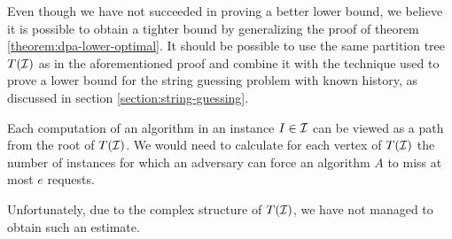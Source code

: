 Even though we have not succeeded in proving a better lower bound, we
believe it is possible to obtain a tighter bound by generalizing the proof
of theorem \ref{theorem:dpa-lower-optimal}. It should be possible to use
the same partition tree $T(\mathcal{I})$ as in the aforementioned proof and combine
it with the technique used to prove a lower bound for the string guessing
problem with known history, as discussed in section
\ref{section:string-guessing}.

Each computation of an algorithm in an instance $I \in \mathcal{I}$ can be viewed
as a path from the root of $T(\mathcal{I})$. We would need to calculate for each
vertex of $T(\mathcal{I})$ the number of instances for which an adversary can
force an algorithm $A$ to miss at most $e$ requests.

Unfortunately, due to the complex structure of $T(\mathcal{I})$, we have not
managed to obtain such an estimate.

